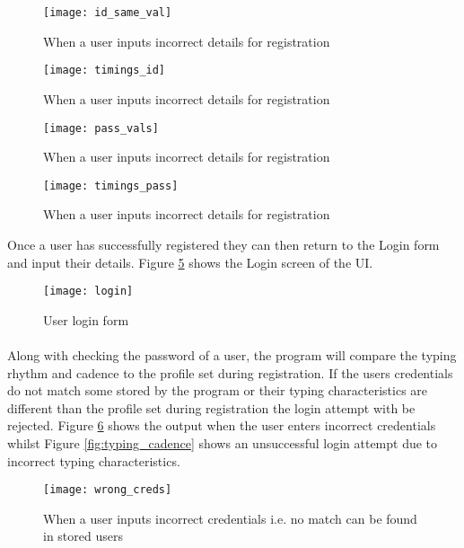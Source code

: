 \documentclass{article}
\begin{document}
\begin{figure}[H]
    \centering
    \texttt{[image: id\_same\_val]}
    \caption{When a user inputs incorrect details for registration}
    \label{fig:id_same_val}
\end{figure}

\begin{figure}[H]
    \centering
    \texttt{[image: timings\_id]}
    \caption{When a user inputs incorrect details for registration}
    \label{fig:timings_id}
\end{figure}

\begin{figure}[H]
    \centering
    \texttt{[image: pass\_vals]}
    \caption{When a user inputs incorrect details for registration}
    \label{fig:pass_vals}
\end{figure}

\begin{figure}[H]
    \centering
    \texttt{[image: timings\_pass]}
    \caption{When a user inputs incorrect details for registration}
    \label{fig:timings_pass}
\end{figure}

Once a user has successfully registered they can then return to the Login form and input their details. Figure \ref{fig:login} shows the Login screen of the UI. 

\begin{figure}[H]
    \centering
    \texttt{[image: login]}
    \caption{User login form}
    \label{fig:login}
\end{figure}

\paragraph{}
Along with checking the password of a user, the program will compare the typing rhythm and cadence to the profile set during registration. If the users credentials do not match some stored by the program or their typing characteristics are different than the profile set during registration the login attempt with be rejected. Figure \ref{fig:wrong_creds} shows the output when the user enters incorrect credentials whilst Figure \ref{fig:typing_cadence} shows an unsuccessful login attempt due to incorrect typing characteristics.


\begin{figure}[H]
    \centering
    \texttt{[image: wrong\_creds]}
    \caption{When a user inputs incorrect credentials i.e. no match can be found in stored users}
    \label{fig:wrong_creds}
\end{figure}
\end{document}
